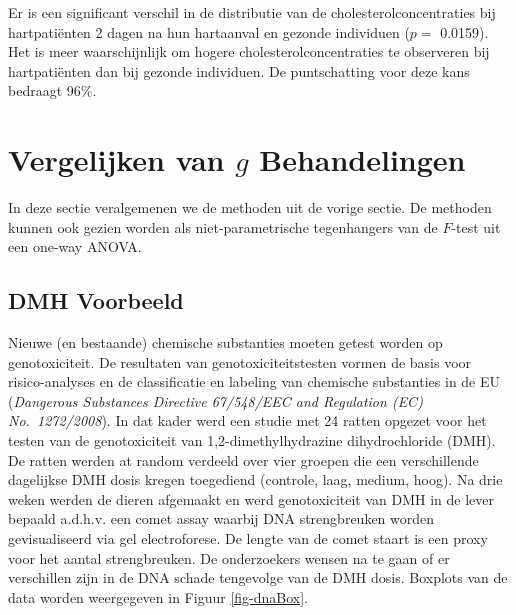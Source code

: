 \documentclass[
  dutch,
  letterpaper,
  12pt]{book}
\newenvironment{Shaded}{\begin{snugshade}}{\end{snugshade}}
\newcommand{\AttributeTok}[1]{\textcolor[rgb]{0.40,0.45,0.13}{#1}}
\newcommand{\FunctionTok}[1]{\textcolor[rgb]{0.28,0.35,0.67}{#1}}
\newcommand{\NormalTok}[1]{\textcolor[rgb]{0.00,0.23,0.31}{#1}}
\newcommand{\OtherTok}[1]{\textcolor[rgb]{0.00,0.23,0.31}{#1}}
\newcommand{\SpecialCharTok}[1]{\textcolor[rgb]{0.37,0.37,0.37}{#1}}
\newcommand{\StringTok}[1]{\textcolor[rgb]{0.13,0.47,0.30}{#1}}
\theoremstyle{definition}
\theoremstyle{definition}
\theoremstyle{definition}
\theoremstyle{remark}
\begin{document}
Er is een significant verschil in de distributie van de
cholesterolconcentraties bij hartpatiënten 2 dagen na hun hartaanval en
gezonde individuen (\(p=\) 0.0159). Het is meer waarschijnlijk om hogere
cholesterolconcentraties te observeren bij hartpatiënten dan bij gezonde
individuen. De puntschatting voor deze kans bedraagt 96\%.

\section{\texorpdfstring{Vergelijken van \(g\)
Behandelingen}{Vergelijken van g Behandelingen}}\label{vergelijken-van-g-behandelingen}

In deze sectie veralgemenen we de methoden uit de vorige sectie. De
methoden kunnen ook gezien worden als niet-parametrische tegenhangers
van de \(F\)-test uit een one-way ANOVA.

\subsection{DMH Voorbeeld}\label{dmh-voorbeeld}

Nieuwe (en bestaande) chemische substanties moeten getest worden op
genotoxiciteit. De resultaten van genotoxiciteitstesten vormen de basis
voor risico-analyses en de classificatie en labeling van chemische
substanties in de EU (\emph{Dangerous Substances Directive 67/548/EEC
and Regulation (EC) No.~1272/2008}). In dat kader werd een studie met 24
ratten opgezet voor het testen van de genotoxiciteit van
1,2-dimethylhydrazine dihydrochloride (DMH). De ratten werden at random
verdeeld over vier groepen die een verschillende dagelijkse DMH dosis
kregen toegediend (controle, laag, medium, hoog). Na drie weken werden
de dieren afgemaakt en werd genotoxiciteit van DMH in de lever bepaald
a.d.h.v. een comet assay waarbij DNA strengbreuken worden gevisualiseerd
via gel electroforese. De lengte van de comet staart is een proxy voor
het aantal strengbreuken. De onderzoekers wensen na te gaan of er
verschillen zijn in de DNA schade tengevolge van de DMH dosis. Boxplots
van de data worden weergegeven in Figuur \ref{fig-dnaBox}.

\begin{Shaded}
\end{Shaded}
\end{document}
